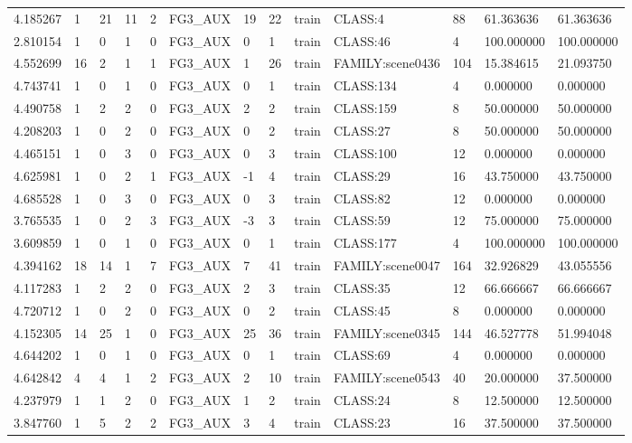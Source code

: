 \begin{tabular}{lllllllllllll}
4.185267 & 1 & 21 & 11 & 2 & FG3\_AUX & 19 & 22 & train & CLASS:4 & 88 & 61.363636 & 61.363636 \\
2.810154 & 1 & 0 & 1 & 0 & FG3\_AUX & 0 & 1 & train & CLASS:46 & 4 & 100.000000 & 100.000000 \\
4.552699 & 16 & 2 & 1 & 1 & FG3\_AUX & 1 & 26 & train & FAMILY:scene0436 & 104 & 15.384615 & 21.093750 \\
4.743741 & 1 & 0 & 1 & 0 & FG3\_AUX & 0 & 1 & train & CLASS:134 & 4 & 0.000000 & 0.000000 \\
4.490758 & 1 & 2 & 2 & 0 & FG3\_AUX & 2 & 2 & train & CLASS:159 & 8 & 50.000000 & 50.000000 \\
4.208203 & 1 & 0 & 2 & 0 & FG3\_AUX & 0 & 2 & train & CLASS:27 & 8 & 50.000000 & 50.000000 \\
4.465151 & 1 & 0 & 3 & 0 & FG3\_AUX & 0 & 3 & train & CLASS:100 & 12 & 0.000000 & 0.000000 \\
4.625981 & 1 & 0 & 2 & 1 & FG3\_AUX & -1 & 4 & train & CLASS:29 & 16 & 43.750000 & 43.750000 \\
4.685528 & 1 & 0 & 3 & 0 & FG3\_AUX & 0 & 3 & train & CLASS:82 & 12 & 0.000000 & 0.000000 \\
3.765535 & 1 & 0 & 2 & 3 & FG3\_AUX & -3 & 3 & train & CLASS:59 & 12 & 75.000000 & 75.000000 \\
3.609859 & 1 & 0 & 1 & 0 & FG3\_AUX & 0 & 1 & train & CLASS:177 & 4 & 100.000000 & 100.000000 \\
4.394162 & 18 & 14 & 1 & 7 & FG3\_AUX & 7 & 41 & train & FAMILY:scene0047 & 164 & 32.926829 & 43.055556 \\
4.117283 & 1 & 2 & 2 & 0 & FG3\_AUX & 2 & 3 & train & CLASS:35 & 12 & 66.666667 & 66.666667 \\
4.720712 & 1 & 0 & 2 & 0 & FG3\_AUX & 0 & 2 & train & CLASS:45 & 8 & 0.000000 & 0.000000 \\
4.152305 & 14 & 25 & 1 & 0 & FG3\_AUX & 25 & 36 & train & FAMILY:scene0345 & 144 & 46.527778 & 51.994048 \\
4.644202 & 1 & 0 & 1 & 0 & FG3\_AUX & 0 & 1 & train & CLASS:69 & 4 & 0.000000 & 0.000000 \\
4.642842 & 4 & 4 & 1 & 2 & FG3\_AUX & 2 & 10 & train & FAMILY:scene0543 & 40 & 20.000000 & 37.500000 \\
4.237979 & 1 & 1 & 2 & 0 & FG3\_AUX & 1 & 2 & train & CLASS:24 & 8 & 12.500000 & 12.500000 \\
3.847760 & 1 & 5 & 2 & 2 & FG3\_AUX & 3 & 4 & train & CLASS:23 & 16 & 37.500000 & 37.500000 \\

\end{tabular}
